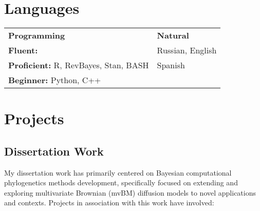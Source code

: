 \documentclass[12pt]{article}
\begin{document}
\section{Languages}

\noindent\begin{tabular}{@{}ll}
\hspace{2cm} \textbf{Programming}         & \hspace{3cm}                          \textbf{Natural}\\
\textbf{Fluent:} & \hspace{3cm} Russian, English\\
\textbf{Proficient:} R, RevBayes, Stan, BASH &  \hspace{3cm} Spanish\\
\textbf{Beginner:}  \hspace{0.035cm} Python, C++ &  \hspace{3cm} \\

\end{tabular}

\section{Projects}

\subsection{Dissertation Work}

My dissertation work has primarily centered on Bayesian computational phylogenetics methods development, specifically focused on extending and exploring multivariate Brownian (mvBM) diffusion models to novel applications and contexts. Projects in association with this work have involved:
\end{document}
